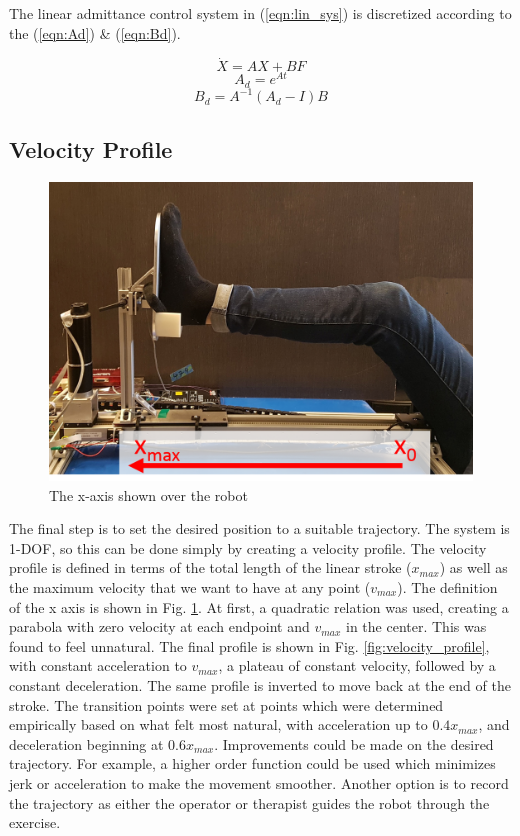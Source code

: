 \documentclass[12pt]{report}
\begin{document}
	The linear admittance control system in (\ref{eqn:lin_sys}) is discretized according to the (\ref{eqn:Ad}) \& (\ref{eqn:Bd}).
	
	\begin{equation} \label{eqn:lin_sys} 
	\dot{X} = AX + BF
	\end{equation}
	\begin{equation} \label{eqn:Ad} 
	A_d = e^{At} 
	\end{equation}
	\begin{equation} \label{eqn:Bd} 
	B_d = A^{-1}(A_d - I)B
	\end{equation}
	
	\subsection{Velocity Profile}	
	
		\begin{figure}[h] 
		\centering
		\includegraphics[width=0.6\linewidth]{axis}
		\caption{The x-axis shown over the robot}
		\label{fig:axis}
	\end{figure}
	
	The final step is to set the desired position to a suitable trajectory. The system is 1-DOF, so this can be done simply by creating a velocity profile. The velocity profile is defined in terms of the total length of the linear stroke ($x_{max}$) as well as the maximum velocity that we want to have at any point ($v_{max}$). The definition of the x axis is shown in Fig. \ref{fig:axis}. At first, a quadratic relation was used, creating a parabola with zero velocity at each endpoint and $v_{max}$ in the center. This was found to feel unnatural. The final profile is shown in Fig. \ref{fig:velocity_profile}, with constant acceleration to $v_{max}$, a plateau of constant velocity, followed by a constant deceleration. The same profile is inverted to move back at the end of the stroke. The transition points were set at points which were determined empirically based on what felt most natural, with acceleration up to $0.4 x_{max}$, and deceleration beginning at $0.6 x_{max}$. 
	Improvements could be made on the desired trajectory. For example, a higher order function could be used which minimizes jerk or acceleration to make the movement smoother. Another option is to record the trajectory as either the operator or therapist guides the robot through the exercise.
	
\end{document}
